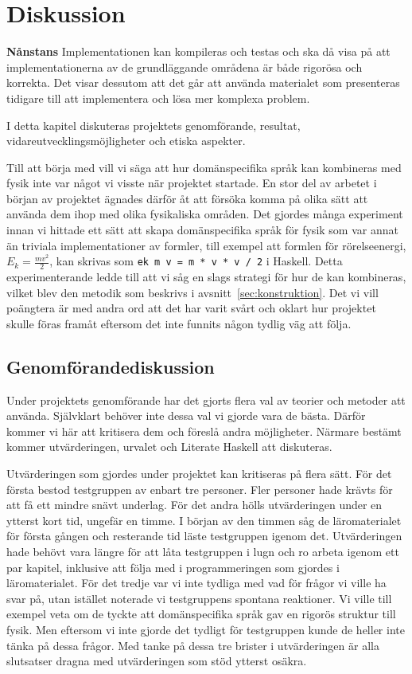 
\chapter{Diskussion}\label{cha:disk}
\textbf{Nånstans}
Implementationen kan kompileras och testas och ska då visa på att
implementationerna av de grundläggande områdena är både rigorösa och korrekta.
Det visar dessutom att det går att använda materialet som presenteras tidigare
till att implementera och lösa mer komplexa problem.

I detta kapitel diskuteras projektets genomförande, resultat,
vidareutvecklingsmöjligheter och etiska aspekter.

Till att börja med vill vi säga att hur domänspecifika språk kan kombineras med
fysik inte var något vi visste när projektet startade. En stor del av arbetet i
början av projektet ägnades därför åt att försöka komma på olika sätt att
använda dem ihop med olika fysikaliska områden. Det gjordes många experiment
innan vi hittade ett sätt att skapa domänspecifika språk för fysik som var annat än
triviala implementationer av formler, till exempel att formlen för
rörelseenergi, $E_k = \frac{mv^2}{2}$, kan skrivas som \texttt{ek m v = m * v *
v / 2} i Haskell. Detta experimenterande ledde till att
vi såg en slags strategi för hur de kan kombineras, vilket blev den
metodik som beskrivs i avsnitt~\ref{sec:konstruktion}. Det vi vill poängtera är
med andra ord att det har varit svårt och oklart hur projektet skulle föras
framåt eftersom det inte funnits någon tydlig väg att följa.

\section{Genomförandediskussion}

Under projektets genomförande har det gjorts flera val av teorier och metoder
att använda. Självklart behöver inte dessa val vi gjorde vara de bästa.
Därför kommer vi här att kritisera dem och föreslå andra möjligheter. Närmare
bestämt kommer utvärderingen, urvalet och Literate Haskell att diskuteras.

Utvärderingen som gjordes under projektet kan kritiseras på flera sätt. För det
första bestod testgruppen av enbart tre personer. Fler
personer hade krävts för att få ett mindre snävt underlag. För det andra hölls
utvärderingen under en ytterst kort tid, ungefär en timme. I början av den
timmen såg de läromaterialet för första gången och resterande tid läste
testgruppen igenom det. Utvärderingen hade behövt vara längre för att låta testgruppen
i lugn och ro arbeta igenom ett par kapitel, inklusive att följa med i
programmeringen som gjordes i läromaterialet. För det tredje var vi inte tydliga
med vad för frågor vi ville ha svar på, utan istället noterade vi testgruppens
spontana reaktioner. Vi ville till exempel veta om de tyckte att domänspecifika
språk gav en rigorös struktur till fysik. Men eftersom vi inte gjorde det
tydligt för testgruppen kunde de heller inte tänka på dessa frågor. Med tanke på
dessa tre brister i utvärderingen är alla slutsatser dragna med utvärderingen
som stöd ytterst osäkra.

